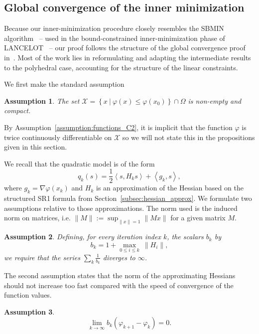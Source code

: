 \documentclass{article}
\numberwithin{equation}{section}
\newcommand{\calX}{{\mathcal{X}}}
\newcommand{\inner}[2]{\left\langle {#1} , {#2} \right\rangle} %
\theoremstyle{plain}
\newtheorem{assumption}{Assumption}
\begin{document}
	\subsection{Global convergence of the inner minimization}
	
	Because our inner-minimization procedure closely resembles the SBMIN algorithm~\cite{conn-etal:1988b} -- used in the bound-constrained inner-minimization phase of LANCELOT~\cite{conn-etal:1992} -- our proof follows the structure of the global convergence proof in~\cite{conn-etal:1988a}. Most of the work lies in reformulating and adapting the intermediate results to the polyhedral case, accounting for the structure of the linear constraints.
	
	We first make the standard assumption
	\begin{assumption}\label{assumption:inner_iterates_compact}
		The set $\calX = \left\{x \ | \ \varphi(x) \le \varphi(x_0)\right\} \cap \Omega$ is non-empty and compact.
	\end{assumption}
	By Assumption~\ref{assumption:functions_C2}, it is implicit that the function $\varphi$ is twice continuously differentiable on $\calX$ so we will not state this in the propositions given in this section.
	
	We recall that the quadratic model is of the form
	\[q_k(s) = \dfrac{1}{2} \inner{s}{H_ks} + \inner{g_k}{s},\]
	where $g_k = \nabla \varphi(x_k)$ and $H_k$ is an approximation of the Hessian based on the structured SR1 formula from Section~\ref{subsec:hessian_approx}. We formulate two assumptions relative to those approximations. The norm used is the induced norm on matrices, i.e. $\|M\| := \sup_{\|x\|=1} \|Mx\|$ for a given matrix $M$.
	\begin{assumption}\label{assumption:model_hessian}
		Defining, for every iteration index $k$, the scalars $b_k$ by 
		\[b_k = 1+\max_{0 \le i \le k} \ \left\| H_i\right\|,\]
		we require that the series $\sum_k \frac{1}{b_k}$ diverges to $\infty$.
	\end{assumption}
	The second assumption states that the norm of the approximating Hessians should not increase too fast compared with the speed of convergence of the function values.
	\begin{assumption}\label{assumption:hessian_norm_compared_convergence_speed}
		\[\lim\limits_{k\to \infty} b_k (\varphi_{k+1}-\varphi_k) = 0.\]
	\end{assumption}
	
\end{document}
